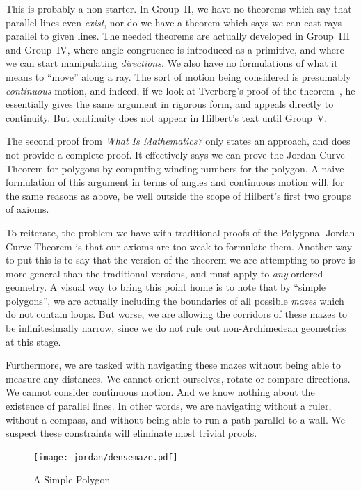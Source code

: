 This is probably a non-starter. In Group~II, we have no theorems which say that parallel lines even \emph{exist}, nor do we have a theorem which says we can cast rays parallel to given lines. The needed theorems are actually developed in Group~III and Group~IV, where angle congruence is introduced as a primitive, and where we can start manipulating \emph{directions}. We also have no formulations of what it means to ``move'' along a ray. The sort of motion being considered is presumably \emph{continuous} motion, and indeed, if we look at Tverberg's proof of the theorem~\cite{TverbergJordan}, he essentially gives the same argument in rigorous form, and appeals directly to continuity. But  continuity does not appear in Hilbert's text until Group~V. 

The second proof from \emph{What Is Mathematics?} only states an approach, and does not provide a complete proof. It effectively says we can prove the Jordan Curve Theorem for polygons by computing winding numbers for the polygon. A naive formulation of this argument in terms of angles and continuous motion will, for the same reasons as above, be well outside the scope of Hilbert's first two groups of axioms. 

To reiterate, the problem we have with traditional proofs of the Polygonal Jordan Curve Theorem is that our axioms are too weak to formulate them. Another way to put this is to say that the version of the theorem we are attempting to prove is more general than the traditional versions, and must apply to \emph{any} ordered geometry. A visual way to bring this point home is to note that by ``simple polygons'', we are actually including the boundaries of all possible \emph{mazes} which do not contain loops. But worse, we are allowing the corridors of these mazes to be infinitesimally narrow, since we do not rule out non-Archimedean geometries at this stage.

Furthermore, we are tasked with navigating these mazes without being able to measure any distances. We cannot orient ourselves, rotate or compare directions. We cannot consider continuous motion. And we know nothing about the existence of parallel lines. In other words, we are navigating without a ruler, without a compass, and without being able to run a path parallel to a wall. We suspect these constraints will eliminate most trivial proofs.

\begin{figure}
\centering
\texttt{[image: jordan/densemaze.pdf]}
\caption{A Simple Polygon}
\end{figure}

